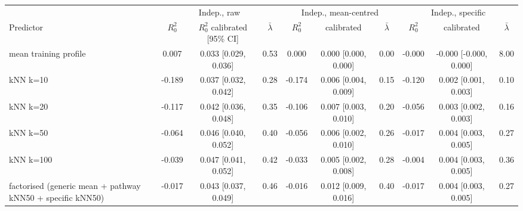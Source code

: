 \begin{tabular}{l ccc ccc ccc}
\toprule
 & \multicolumn{3}{c}{Indep., raw} & \multicolumn{3}{c}{Indep., mean-centred} & \multicolumn{3}{c}{Indep., specific} \\
Predictor & $R^2_0$ & $R^2_0$ calibrated [95\% CI] & $\bar\lambda$ & $R^2_0$ & calibrated & $\bar\lambda$ & $R^2_0$ & calibrated & $\bar\lambda$ \\
\midrule
mean training profile & 0.007 & 0.033 [0.029, 0.036] & 0.53 & 0.000 & 0.000 [0.000, 0.000] & 0.00 & -0.000 & -0.000 [-0.000, 0.000] & 8.00 \\
kNN k=10 & -0.189 & 0.037 [0.032, 0.042] & 0.28 & -0.174 & 0.006 [0.004, 0.009] & 0.15 & -0.120 & 0.002 [0.001, 0.003] & 0.10 \\
kNN k=20 & -0.117 & 0.042 [0.036, 0.048] & 0.35 & -0.106 & 0.007 [0.003, 0.010] & 0.20 & -0.056 & 0.003 [0.002, 0.003] & 0.16 \\
kNN k=50 & -0.064 & 0.046 [0.040, 0.052] & 0.40 & -0.056 & 0.006 [0.002, 0.010] & 0.26 & -0.017 & 0.004 [0.003, 0.005] & 0.27 \\
kNN k=100 & -0.039 & 0.047 [0.041, 0.052] & 0.42 & -0.033 & 0.005 [0.002, 0.008] & 0.28 & -0.004 & 0.004 [0.003, 0.005] & 0.36 \\
factorised (generic mean + pathway kNN50 + specific kNN50) & -0.017 & 0.043 [0.037, 0.049] & 0.46 & -0.016 & 0.012 [0.009, 0.016] & 0.40 & -0.017 & 0.004 [0.003, 0.005] & 0.27 \\
\bottomrule
\end{tabular}
